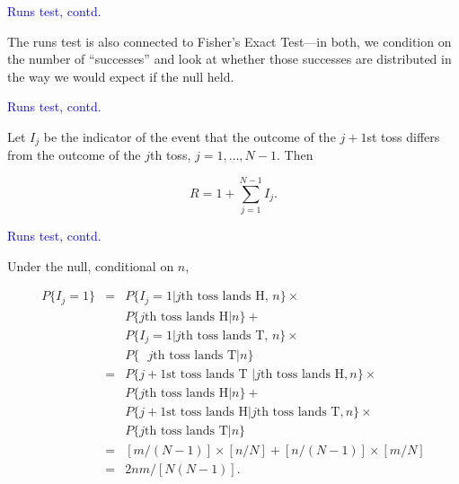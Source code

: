 \documentclass[landscape]{slides}
\newcommand{\beq}{\begin{equation}}
\newcommand{\eeq}{\end{equation}}
\begin{document}
\begin{slide}
{\textcolor{blue}{Runs test, contd.}}
    
    The runs test is also connected to Fisher's Exact Test---in both, we condition
    on the number of ``successes'' and look at whether those successes are
    distributed in the way we would expect if the null held.

\end{slide}

\begin{slide}
{\textcolor{blue}{Runs test, contd.}}

    Let $I_j$ be the indicator of the event that
    the outcome of the $j+1$st toss differs from the outcome of
    the $j$th toss, $j=1, \ldots, N-1$.
    Then

\beq
    R = 1+ \sum_{j=1}^{N-1} I_j.
\eeq

\end{slide}

\begin{slide}
{\textcolor{blue}{Runs test, contd.}}

Under the null, conditional on $n$,

\begin{eqnarray}
    P\{I_j = 1\} & = & P\{I_j = 1 | \mbox{$j$th toss lands H, $n$} \} \times \nonumber \\
                            && P\{\mbox{$j$th toss lands H} | n \}+ \nonumber  \\
                            && P\{I_j = 1 | \mbox{$j$th toss lands T, $n$}\} \times \nonumber \\
                            && P\{\mbox{ $j$th toss lands T} | n\}
                            \nonumber \\
                  & = & P\{ \mbox{$j+1$st toss lands T } | \mbox{$j$th toss lands H}, n \} \times \nonumber \\
                         &&    P\{\mbox{$j$th toss lands H} | n\} + \nonumber \\
                        && P\{\mbox{$j+1$st toss lands H} | \mbox{$j$th toss lands T}, n \}  \times \nonumber \\
                        &&   P\{\mbox{$j$th toss lands T} | n\} 
                       \nonumber \\
                  & = & [m/(N-1)]\times[n/N] + [n/(N-1)]\times[m/N] \nonumber \\
                  &  = & 2nm/[N(N-1)].
\end{eqnarray}

\end{slide}
\end{document}
